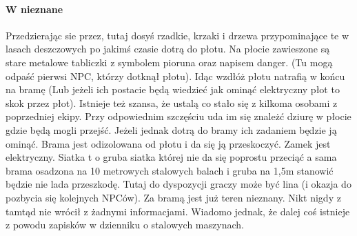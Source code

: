 \documentclass{article}
\newcommand{\paragraphx}[1]{
        \paragraph{\Large{{#1}}}\mbox{}

    }
\begin{document}
    \paragraphx{W nieznane}

    Przedzierając sie przez, tutaj dosyś rzadkie, krzaki i drzewa przypominające te w lasach deszczowych po jakimś czasie dotrą do płotu. Na płocie zawieszone są stare metalowe tabliczki z symbolem pioruna oraz napisem danger. (Tu mogą odpaść pierwsi NPC, którzy dotknął płotu). Idąc wzdłóż płotu natrafią w końcu na bramę (Lub jeżeli ich postacie będą wiedzieć jak ominąć elektryczny płot to skok przez płot). Istnieje też szansa, że ustalą co stało się z kilkoma osobami z poprzedniej ekipy. Przy odpowiednim szczęściu uda im się znależć dziurę w płocie gdzie będą mogli przejść. Jeżeli jednak dotrą do bramy ich zadaniem będzie ją ominąć. Brama jest odizolowana od płotu i da się ją przeskoczyć. Zamek jest elektryczny. Siatka t o gruba siatka której nie da się poprostu przeciąć a sama brama osadzona na 10 metrowych stalowych balach i gruba na 1,5m stanowić będzie nie lada przeszkodę. Tutaj do dyspozycji graczy może być lina (i okazja do pozbycia się kolejnych NPCów). Za bramą jest już teren nieznany. Nikt nigdy z tamtąd nie wrócił z żadnymi informacjami. Wiadomo jednak, że dalej coś istnieje z powodu zapisków w dzienniku o stalowych maszynach.
    
\end{document}
